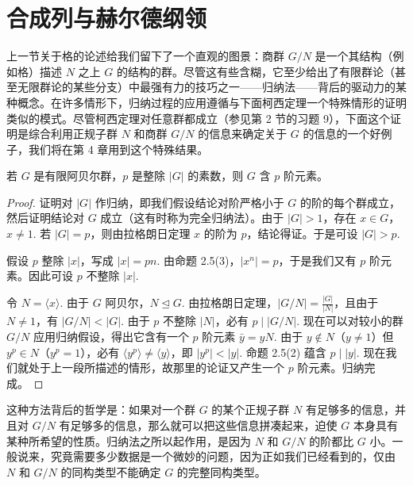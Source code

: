 \section{合成列与赫尔德纲领}

上一节关于格的论述给我们留下了一个直观的图景：商群 \(G/N\) 是一个其结构（例如格）描述 \(N\) 之上 \(G\) 的结构的群。尽管这有些含糊，它至少给出了有限群论（甚至无限群论的某些分支）中最强有力的技巧之一——归纳法——背后的驱动力的某种概念。在许多情形下，归纳过程的应用遵循与下面柯西定理一个特殊情形的证明类似的模式。尽管柯西定理对任意群都成立（参见第 2 节的习题 9），下面这个证明是综合利用正规子群 \(N\) 和商群 \(G/N\) 的信息来确定关于 \(G\) 的信息的一个好例子，我们将在第 4 章用到这个特殊结果。

\begin{proposition}\label{pro:3.21}
若 \(G\) 是有限阿贝尔群，\(p\) 是整除 \(|G|\) 的素数，则 \(G\) 含 \(p\) 阶元素。
\end{proposition}

\begin{proof}
证明对 \(|G|\) 作归纳，即我们假设结论对阶严格小于 \(G\) 的阶的每个群成立，然后证明结论对 \(G\) 成立（这有时称为完全归纳法）。由于 \(|G| > 1\)，存在 \(x \in G\)，\(x \neq 1\). 若 \(|G| = p\)，则由拉格朗日定理 \(x\) 的阶为 \(p\)，结论得证。于是可设 \(|G| > p\).

假设 \(p\) 整除 \(|x|\)，写成 \(|x| = pn\). 由命题 2.5(3)，\(|x^n| = p\)，于是我们又有 \(p\) 阶元素。因此可设 \(p\) 不整除 \(|x|\).

令 \(N = \langle x \rangle\). 由于 \(G\) 阿贝尔，\(N \trianglelefteq G\). 由拉格朗日定理，\(|G/N| = \frac{|G|}{|N|}\)，且由于 \(N \neq 1\)，有 \(|G/N| < |G|\). 由于 \(p\) 不整除 \(|N|\)，必有 \(p \mid |G/N|\). 现在可以对较小的群 \(G/N\) 应用归纳假设，得出它含有一个 \(p\) 阶元素 \(\bar{y} = yN\). 由于 \(y \notin N\)（\(y \neq 1\)）但 \(y^p \in N\)（\(y^p = 1\)），必有 \(\langle y^p \rangle \neq \langle y \rangle\)，即 \(|y^p| < |y|\). 命题 2.5(2) 蕴含 \(p \mid |y|\). 现在我们就处于上一段所描述的情形，故那里的论证又产生一个 \(p\) 阶元素。归纳完成。
\end{proof}

这种方法背后的哲学是：如果对一个群 \(G\) 的某个正规子群 \(N\) 有足够多的信息，并且对 \(G/N\) 有足够多的信息，那么就可以把这些信息拼凑起来，迫使 \(G\) 本身具有某种所希望的性质。归纳法之所以起作用，是因为 \(N\) 和 \(G/N\) 的阶都比 \(G\) 小。一般说来，究竟需要多少数据是一个微妙的问题，因为正如我们已经看到的，仅由 \(N\) 和 \(G/N\) 的同构类型不能确定 \(G\) 的完整同构类型。

